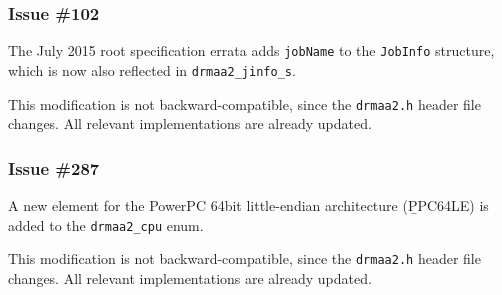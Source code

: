 \documentclass{article}
\newcommand{\h}[1]{\texttt{#1}}
\begin{document}
\subsubsection*{Issue \#102}

The July 2015 root specification errata adds \h{jobName} to the \h{JobInfo} structure, which is now also reflected in \h{drmaa2\_jinfo\_s}.

This modification is not backward-compatible, since the \h{drmaa2.h} header file changes. All relevant implementations are already updated.

\subsubsection*{Issue \#287}

A new element for the PowerPC 64bit little-endian architecture (\b{PPC64LE}) is added to the \h{drmaa2_cpu} enum.

This modification is not backward-compatible, since the \h{drmaa2.h} header file changes. All relevant implementations are already updated.
\end{document}

